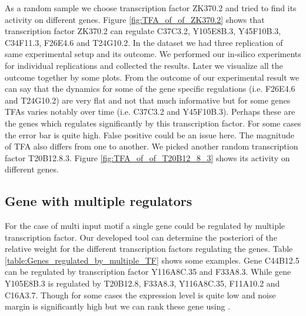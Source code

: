As a random sample we choose transcription factor ZK370.2 and tried to find its activity on different genes. Figure \ref{fig:TFA_of_of_ZK370.2} shows that transcription factor ZK370.2 can regulate C37C3.2, Y105E8B.3, Y45F10B.3, C34F11.3, F26E4.6 and T24G10.2. In the dataset we had three replication of same experimental setup and its outcome. We performed our in-silico experiments for individual replications and collected the results. Later we visualize all the outcome together by some plots. From the outcome of our experimental result we can say that the dynamics for some of the gene specific regulations (i.e. F26E4.6 and T24G10.2) are very flat and not that much informative but for some genes TFAs varies notably over time (i.e. C37C3.2 and Y45F10B.3). Perhaps these are the genes which regulates significantly by this transcription factor. For some cases the error bar is quite high. False positive could be an issue here. The magnitude of TFA also differs from one to another. We picked another random transcription factor T20B12.8.3. Figure \ref{fig:TFA_of_of_T20B12_8_3} shows its activity on different genes.


\subsection{Gene with multiple regulators}
For the case of multi input motif a single gene could be regulated by multiple transcription factor. Our developed tool can determine the posteriori of the relative weight for the different transcription
factors regulating the genes. Table \ref{table:Genes_regulated_by_multiple_TF} shows some examples. Gene C44B12.5 can be regulated by transcription factor Y116A8C.35 and F33A8.3. While gene
Y105E8B.3 is regulated by T20B12.8, F33A8.3, Y116A8C.35, F11A10.2 and C16A3.7. Though for some cases the expression level is quite low and noise margin is significantly high but we can rank these 
gene using \cite{Kalaitzis:2011}.


